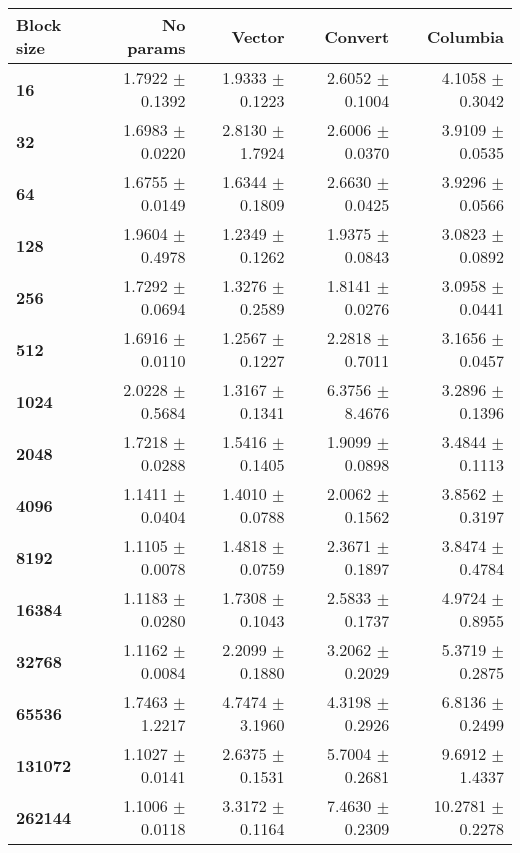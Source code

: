 \begin{tabular}{lrrrr}\toprule
\textbf{Block size}  & \textbf{No params} & \textbf{Vector} & \textbf{Convert} & \textbf{Columbia}\\\midrule
\textbf{16}  & 1.7922 $\pm$ 0.1392 & 1.9333 $\pm$ 0.1223 & 2.6052 $\pm$ 0.1004 & 4.1058 $\pm$ 0.3042\\
\textbf{32}  & 1.6983 $\pm$ 0.0220 & 2.8130 $\pm$ 1.7924 & 2.6006 $\pm$ 0.0370 & 3.9109 $\pm$ 0.0535\\
\textbf{64}  & 1.6755 $\pm$ 0.0149 & 1.6344 $\pm$ 0.1809 & 2.6630 $\pm$ 0.0425 & 3.9296 $\pm$ 0.0566\\
\textbf{128}  & 1.9604 $\pm$ 0.4978 & 1.2349 $\pm$ 0.1262 & 1.9375 $\pm$ 0.0843 & 3.0823 $\pm$ 0.0892\\
\textbf{256}  & 1.7292 $\pm$ 0.0694 & 1.3276 $\pm$ 0.2589 & 1.8141 $\pm$ 0.0276 & 3.0958 $\pm$ 0.0441\\
\textbf{512}  & 1.6916 $\pm$ 0.0110 & 1.2567 $\pm$ 0.1227 & 2.2818 $\pm$ 0.7011 & 3.1656 $\pm$ 0.0457\\
\textbf{1024}  & 2.0228 $\pm$ 0.5684 & 1.3167 $\pm$ 0.1341 & 6.3756 $\pm$ 8.4676 & 3.2896 $\pm$ 0.1396\\
\textbf{2048}  & 1.7218 $\pm$ 0.0288 & 1.5416 $\pm$ 0.1405 & 1.9099 $\pm$ 0.0898 & 3.4844 $\pm$ 0.1113\\
\textbf{4096}  & 1.1411 $\pm$ 0.0404 & 1.4010 $\pm$ 0.0788 & 2.0062 $\pm$ 0.1562 & 3.8562 $\pm$ 0.3197\\
\textbf{8192}  & 1.1105 $\pm$ 0.0078 & 1.4818 $\pm$ 0.0759 & 2.3671 $\pm$ 0.1897 & 3.8474 $\pm$ 0.4784\\
\textbf{16384}  & 1.1183 $\pm$ 0.0280 & 1.7308 $\pm$ 0.1043 & 2.5833 $\pm$ 0.1737 & 4.9724 $\pm$ 0.8955\\
\textbf{32768}  & 1.1162 $\pm$ 0.0084 & 2.2099 $\pm$ 0.1880 & 3.2062 $\pm$ 0.2029 & 5.3719 $\pm$ 0.2875\\
\textbf{65536}  & 1.7463 $\pm$ 1.2217 & 4.7474 $\pm$ 3.1960 & 4.3198 $\pm$ 0.2926 & 6.8136 $\pm$ 0.2499\\
\textbf{131072}  & 1.1027 $\pm$ 0.0141 & 2.6375 $\pm$ 0.1531 & 5.7004 $\pm$ 0.2681 & 9.6912 $\pm$ 1.4337\\
\textbf{262144} & 1.1006 $\pm$ 0.0118 & 3.3172 $\pm$ 0.1164 & 7.4630 $\pm$ 0.2309 & 10.2781 $\pm$ 0.2278\\
\bottomrule
\end{tabular}
